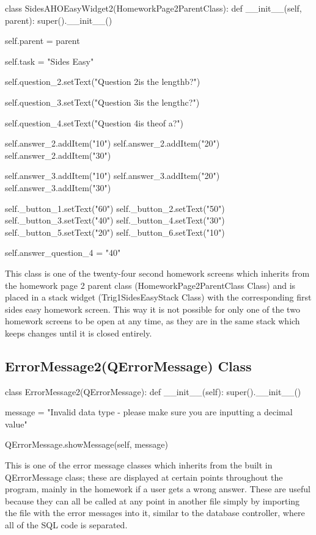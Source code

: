 \begin{python}
class SidesAHOEasyWidget2(HomeworkPage2ParentClass):
    def __init__(self, parent):
        super().__init__()

        self.parent = parent

        self.task = "Sides Easy"

        self.question_2.setText("Question 2\nWhat is the length\nof b?")
        
        self.question_3.setText("Question 3\nWhat is the length\nof c?")
        
        self.question_4.setText("Question 4\nWhat is the\nlength of a?")

        self.answer_2.addItem("10")
        self.answer_2.addItem("20")
        self.answer_2.addItem("30")

        self.answer_3.addItem("10")
        self.answer_3.addItem("20")
        self.answer_3.addItem("30")

        self._button_1.setText("60")
        self._button_2.setText("50")
        self._button_3.setText("40")
        self._button_4.setText("30")
        self._button_5.setText("20")
        self._button_6.setText("10")

        self.answer_question_4 = "40"
\end{python}

This class is one of the twenty-four second homework screens which inherits from the homework page 2 parent class (HomeworkPage2ParentClass Class) and is placed in a stack widget (Trig1SidesEasyStack Class) with the corresponding first sides easy homework screen. This way it is not possible for only one of the two homework screens to be open at any time, as they are in the same stack which keeps changes until it is closed entirely.

\subsection{ErrorMessage2(QErrorMessage) Class}

\begin{python}
class ErrorMessage2(QErrorMessage):
    def __init__(self):
        super().__init__()
        
        message = "Invalid data type - please make sure you are inputting a decimal value"

        QErrorMessage.showMessage(self, message)
\end{python}

This is one of the error message classes which inherits from the built in QErrorMessage class; these are displayed at certain points throughout the program, mainly in the homework if a user gets a wrong answer. These are useful because they can all be called at any point in another file simply by importing the file with the error messages into it, similar to the database controller, where all of the SQL code is separated.

